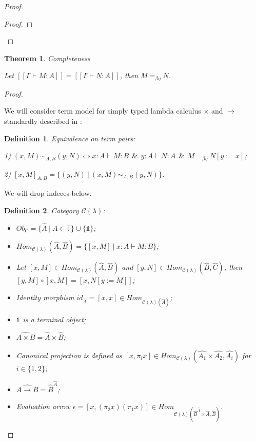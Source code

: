 \documentclass[a4paper]{article}
\newtheorem{theorem}{Theorem}
\newtheorem{defin}{Definition}
\begin{document}
\begin{proof}
\begin{proof}
\end{proof}

\end{proof}

\begin{theorem} Completeness

Let $[\![\Gamma \vdash M : A]\!] = [\![\Gamma \vdash N : A]\!]$, then $M =_{\beta \eta} N$.
\end{theorem}

\begin{proof}

$ $

We will consider term model for simply typed lambda calculus $\times$ and $\to$ standardly described in \cite{LambekScott}:

\begin{defin} Equivalence on term pairs:
  $ $

  1) $(x, M) \sim_{A, B} (y, N) \Leftrightarrow x : A \vdash M : B \:\: \& \:\: y : A \vdash N : A \:\: \& \:\: M =_{\beta \eta} N [y := x]$;

  2) $[x, M]_{A, B} = \{ (y, N) \: | \: (x, M) \sim_{A, B} (y, N) \}$.
\end{defin}

We will drop indeces below.

\begin{defin} Category $\mathcal{C}(\lambda)$:
\begin{itemize}
  \item $Ob_{\mathcal{C}} = \{ \hat{A} \: | \: A \in \mathbb{T} \} \cup \{ \mathds{1} \}$;
  \item $Hom_{\mathcal{C}(\lambda)}(\hat{A},\hat{B}) = \{ [x,M] \: | \: x : A \vdash M : B \}$;
  \item Let $[x, M] \in Hom_{\mathcal{C}(\lambda)}(\hat{A},\hat{B})$ and $[y,N] \in Hom_{\mathcal{C}(\lambda)}(\hat{B},\hat{C})$, then $[y,M] \circ [x, M] = [x, N [y := M]]$;
  \item Identity morphism $id_{\hat{A}} = [x,x] \in Hom_{\mathcal{C}(\lambda)(\hat{A})}$;
  \item $\mathds{1}$ is a terminal object;
  \item $\widehat{A \times B} = \hat{A} \times \hat{B}$;
  \item Canonical projection is defined as $[x, \pi_i x] \in Hom_{\mathcal{C}(\lambda)}(\hat{A_1} \times \hat{A_2},\hat{A_i})$ for $i \in \{ 1, 2 \}$;
  \item $\widehat{A \to B} = \hat{B}^{\hat{A}}$;
  \item Evaluation arrow $\epsilon = [x, (\pi_2 x) (\pi_1 x)] \in Hom_{\mathcal{C}(\lambda)(\hat{B}^{\hat{A}} \times \hat{A}, \hat{B})}$.
\end{itemize}
\end{defin}


\end{proof}
\end{document}
